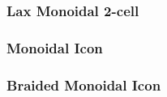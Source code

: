 %


\subsubsection*{Lax Monoidal 2-cell}

  \newpage

 \newpage

 \newpage





%
%

\newpage
\subsubsection*{Monoidal Icon}

\newpage

\newpage

\newpage

\subsubsection*{Braided Monoidal Icon}

